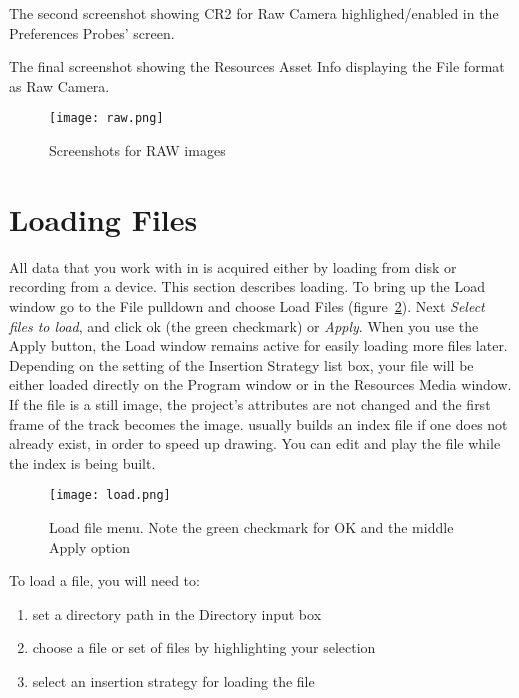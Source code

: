 The second screenshot showing CR2 for Raw Camera highlighed/enabled in the Preferences Probes’ screen.

The final screenshot showing the Resources Asset Info displaying the File format as Raw Camera.

\begin{figure}[htpb]
    \centering
    \texttt{[image: raw.png]}
    \caption{Screenshots for RAW images}
    \label{fig:raw}
\end{figure}

\section{Loading Files}%
\label{sec:loading_files}

All data that you work with in \CGG{} is acquired either by loading from disk or recording from a device. This section describes loading.  To bring up the Load window go to the File pulldown and choose Load Files  (figure~\ref{fig:load}).  Next \textit{Select files to load}, and click ok (the green checkmark) or \textit{Apply}. When you use the Apply button, the Load window remains active for easily loading more files later.  Depending on the setting of the Insertion Strategy list box, your file will be either loaded directly on the Program window or in the Resources Media window.  If the file is a still image, the project's attributes are not changed and the first frame of the track becomes the image. \CGG{} usually builds an index file if one does not already exist, in order to speed up drawing. You can edit and play the file while the index is being built.

\begin{figure}[htpb]
    \centering
    \texttt{[image: load.png]}
    \caption{Load file menu.  Note the green checkmark for OK and the middle Apply option}
    \label{fig:load}
\end{figure}

\vspace{1ex} \noindent To load a file, you will need to:

\begin{enumerate}
    \item set a directory path in the Directory input box
    \item choose a file or set of files by highlighting your selection
    \item select an insertion strategy for loading the file 
\end{enumerate}

